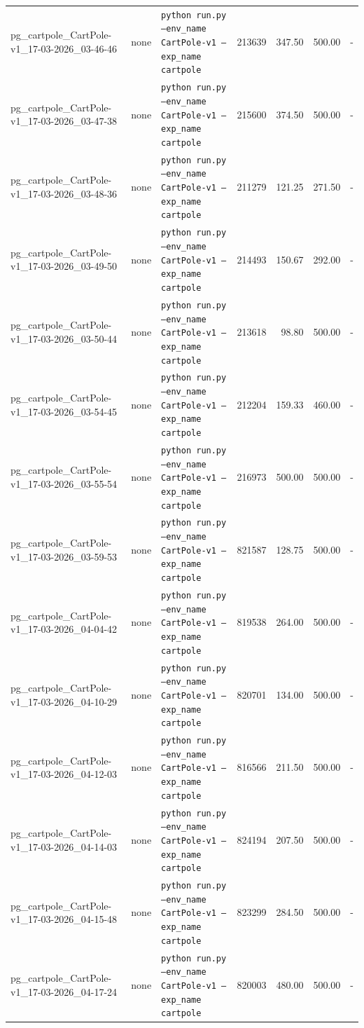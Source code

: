 \begin{table}[h]
\begin{tabular}{l l l r r r r}
pg\_cartpole\_CartPole-v1\_17-03-2026\_03-46-46 & none & \texttt{python run.py --env\_name CartPole-v1 --exp\_name cartpole} & 213639 & 347.50 & 500.00 & - \\
pg\_cartpole\_CartPole-v1\_17-03-2026\_03-47-38 & none & \texttt{python run.py --env\_name CartPole-v1 --exp\_name cartpole} & 215600 & 374.50 & 500.00 & - \\
pg\_cartpole\_CartPole-v1\_17-03-2026\_03-48-36 & none & \texttt{python run.py --env\_name CartPole-v1 --exp\_name cartpole} & 211279 & 121.25 & 271.50 & - \\
pg\_cartpole\_CartPole-v1\_17-03-2026\_03-49-50 & none & \texttt{python run.py --env\_name CartPole-v1 --exp\_name cartpole} & 214493 & 150.67 & 292.00 & - \\
pg\_cartpole\_CartPole-v1\_17-03-2026\_03-50-44 & none & \texttt{python run.py --env\_name CartPole-v1 --exp\_name cartpole} & 213618 & 98.80 & 500.00 & - \\
pg\_cartpole\_CartPole-v1\_17-03-2026\_03-54-45 & none & \texttt{python run.py --env\_name CartPole-v1 --exp\_name cartpole} & 212204 & 159.33 & 460.00 & - \\
pg\_cartpole\_CartPole-v1\_17-03-2026\_03-55-54 & none & \texttt{python run.py --env\_name CartPole-v1 --exp\_name cartpole} & 216973 & 500.00 & 500.00 & - \\
pg\_cartpole\_CartPole-v1\_17-03-2026\_03-59-53 & none & \texttt{python run.py --env\_name CartPole-v1 --exp\_name cartpole} & 821587 & 128.75 & 500.00 & - \\
pg\_cartpole\_CartPole-v1\_17-03-2026\_04-04-42 & none & \texttt{python run.py --env\_name CartPole-v1 --exp\_name cartpole} & 819538 & 264.00 & 500.00 & - \\
pg\_cartpole\_CartPole-v1\_17-03-2026\_04-10-29 & none & \texttt{python run.py --env\_name CartPole-v1 --exp\_name cartpole} & 820701 & 134.00 & 500.00 & - \\
pg\_cartpole\_CartPole-v1\_17-03-2026\_04-12-03 & none & \texttt{python run.py --env\_name CartPole-v1 --exp\_name cartpole} & 816566 & 211.50 & 500.00 & - \\
pg\_cartpole\_CartPole-v1\_17-03-2026\_04-14-03 & none & \texttt{python run.py --env\_name CartPole-v1 --exp\_name cartpole} & 824194 & 207.50 & 500.00 & - \\
pg\_cartpole\_CartPole-v1\_17-03-2026\_04-15-48 & none & \texttt{python run.py --env\_name CartPole-v1 --exp\_name cartpole} & 823299 & 284.50 & 500.00 & - \\
pg\_cartpole\_CartPole-v1\_17-03-2026\_04-17-24 & none & \texttt{python run.py --env\_name CartPole-v1 --exp\_name cartpole} & 820003 & 480.00 & 500.00 & - \\

\end{tabular}
\end{table}
